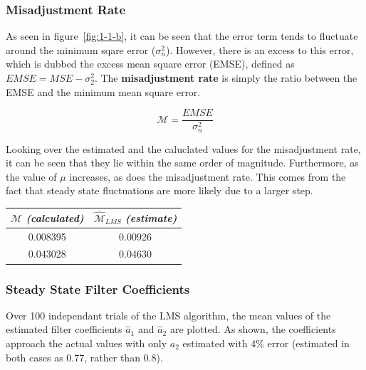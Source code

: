 \documentclass[main.tex]{subfiles}
\begin{document}
\subsubsection{Misadjustment Rate}


As seen in figure~\ref{fig:1-1-b}, it can be seen that the error term tends to fluctuate around the minimum sqare error ($\sigma_n^2$). However, there is an excess to this error, which is dubbed the excess mean square error (EMSE), defined as $EMSE = MSE - \sigma_2^2$. The \textbf{misadjustment rate} is simply the ratio between the EMSE and the minimum mean square error.

\begin{equation}
\mathcal{M} = \frac{EMSE}{\sigma_n^2}
\end{equation}

Looking over the estimated and the caluclated values for the misadjustment rate, it can be seen that they lie within the same order of magnitude. Furthermore, as the value of $\mu$ increases, as does the misadjustment rate. This comes from the fact that steady state fluctuations are more likely due to a larger step.

\begin{table}[h]
	\centering
	\begin{tabular}{ | c |  c | }
		\hline
		$\mathcal{M}$ \textit{(calculated)} & $\hat{\mathcal{M}}_{LMS}$ \textit{(estimate)} \\ \hline
		0.008395      & 0.00926                   \\ \hline
		0.043028      & 0.04630                  \\ \hline
	\end{tabular}
\end{table}










\subsubsection{Steady State Filter Coefficients}

Over 100 independant trials of the LMS algorithm, the mean values of the estimated filter coefficients $\hat{a}_1$ and $\hat{a}_2$ are plotted. As shown, the coefficients approach the actual values with only $a_2$ estimated with 4\% error (estimated in both cases as 0.77, rather than 0.8).
\end{document}
